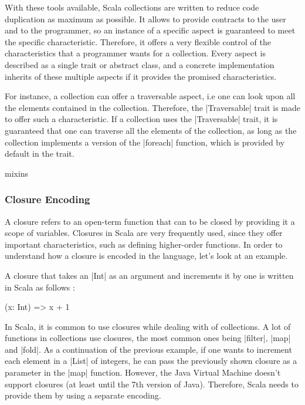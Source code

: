 With these tools available, Scala collections are written to reduce code duplication as maximum as possible.  It allows to provide contracts to the user and to the programmer, so an instance of a specific aspect is guaranteed to meet the specific characteristic. Therefore, it offers a very flexible control of the characteristics that a programmer wants for a collection. Every aspect is described as a single trait or abstract class, and a concrete implementation inherits of these multiple aspects if it provides the promised characteristics.

For instance, a collection can offer a traversable aspect, i.e one can look upon all the elements contained in the collection. Therefore, the |Traversable| trait is made to offer such a characteristic. If a collection uses the |Traversable| trait, it is guaranteed that one can traverse all the elements of the collection, as long as the collection implements a version of the |foreach| function, which is provided by default in the trait.



mixins \cite{scalable-component-abstractions}

\subsubsection{Closure Encoding}

A closure refers to an open-term function that can to be closed by providing it a scope of variables. Closures in Scala are very frequently used, since they offer important characteristics, such as defining higher-order functions. In order to understand how a closure is encoded in the language, let's look at an example.

A closure that takes an |Int| as an argument and increments it by one is written in Scala as follows :

\begin{lstlisting-nobreak}
 (x: Int) => x + 1
\end{lstlisting-nobreak}

In Scala, it is common to use closures while dealing with of collections. A lot of functions in collections use closures, the most common ones being |filter|, |map| and |fold|. As a continuation of the previous example, if one wants to increment each element in a |List| of integers, he can pass the previously shown closure as a parameter in the |map| function. However, the Java Virtual Machine doesn't support closures (at least until the 7th version of Java). Therefore, Scala needs to provide them by using a separate encoding.

